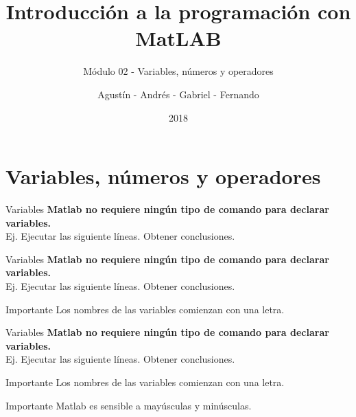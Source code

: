 \documentclass{bredelebeamer}
\title[Programación en MatLAB]{Introducción a la programación con MatLAB}
\subtitle{Módulo 02 - Variables, números y operadores}
\author{Agustín - Andrés - Gabriel - Fernando\inst{1}}
\institute[UTN.BA]
{
  \inst{1}%
  Universidad Tecnológica Nacional\\
  Facultad Regional Buenos Aires
  }
\date{2018}
\begin{document}
\begin{frame}
  \titlepage 
\end{frame}




\section{Variables, números y operadores}

\begin{frame}{Variables}
\textbf{Matlab no requiere ningún tipo de comando para declarar variables.}\\
Ej. Ejecutar las siguiente líneas. Obtener conclusiones.
\end{frame}

\begin{frame}{Variables}
\textbf{Matlab no requiere ningún tipo de comando para declarar variables.}\\
Ej. Ejecutar las siguiente líneas. Obtener conclusiones.
\begin{alertblock}{Importante}
Los nombres de las variables comienzan con una letra.
\end{alertblock}
\end{frame}

\begin{frame}{Variables}
\textbf{Matlab no requiere ningún tipo de comando para declarar variables.}\\
Ej. Ejecutar las siguiente líneas. Obtener conclusiones.
\begin{alertblock}{Importante}
Los nombres de las variables comienzan con una letra.
\end{alertblock}
\begin{alertblock}{Importante}
Matlab es sensible a mayúsculas y minúsculas.
\end{alertblock}
\end{frame}
\end{document}
